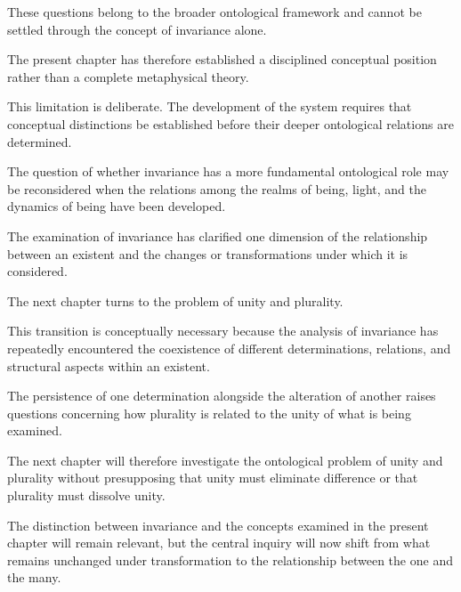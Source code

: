 These questions belong
to the broader ontological
framework and cannot be
settled through the concept
of invariance alone.

The present chapter has
therefore established a
disciplined conceptual
position rather than
a complete metaphysical
theory.

This limitation is deliberate.
The development of the
system requires that
conceptual distinctions
be established before
their deeper ontological
relations are determined.

The question of whether
invariance has a more
fundamental ontological
role may be reconsidered
when the relations among
the realms of being,
light, and the dynamics
of being have been
developed.


The examination of invariance
has clarified one dimension
of the relationship between
an existent and the changes
or transformations under
which it is considered.

The next chapter turns
to the problem of unity
and plurality.

This transition is conceptually
necessary because the analysis
of invariance has repeatedly
encountered the coexistence
of different determinations,
relations, and structural
aspects within an existent.

The persistence of one
determination alongside
the alteration of another
raises questions concerning
how plurality is related
to the unity of what is
being examined.

The next chapter will
therefore investigate
the ontological problem
of unity and plurality
without presupposing
that unity must eliminate
difference or that plurality
must dissolve unity.

The distinction between
invariance and the concepts
examined in the present
chapter will remain relevant,
but the central inquiry
will now shift from what
remains unchanged under
transformation to the
relationship between
the one and the many.

